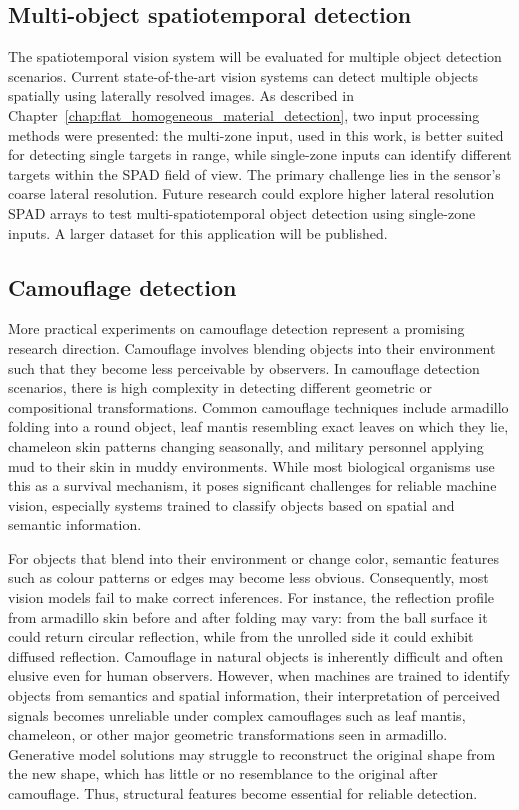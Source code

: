 \documentclass[12pt,a4paper,oneside]{report}
\begin{document}
\subsection{Multi-object spatiotemporal detection}
\label{subsec:multi_object_spatiotemporal_detection}

The spatiotemporal vision system will be evaluated for multiple object detection scenarios. Current state-of-the-art vision systems can detect multiple objects spatially using laterally resolved images. As described in Chapter~\ref{chap:flat_homogeneous_material_detection}, two input processing methods were presented: the multi-zone input, used in this work, is better suited for detecting single targets in range, while single-zone inputs can identify different targets within the SPAD field of view. The primary challenge lies in the sensor's coarse lateral resolution. Future research could explore higher lateral resolution SPAD arrays to test multi-spatiotemporal object detection using single-zone inputs. A larger dataset for this application will be published.

\subsection{Camouflage detection}
\label{subsec:camouflage_detection}

More practical experiments on camouflage detection represent a promising research direction. Camouflage involves blending objects into their environment such that they become less perceivable by observers. In camouflage detection scenarios, there is high complexity in detecting different geometric or compositional transformations. Common camouflage techniques include armadillo folding into a round object, leaf mantis resembling exact leaves on which they lie, chameleon skin patterns changing seasonally, and military personnel applying mud to their skin in muddy environments. While most biological organisms use this as a survival mechanism, it poses significant challenges for reliable machine vision, especially systems trained to classify objects based on spatial and semantic information.

For objects that blend into their environment or change color, semantic features such as colour patterns or edges may become less obvious. Consequently, most vision models fail to make correct inferences. For instance, the reflection profile from armadillo skin before and after folding may vary: from the ball surface it could return circular reflection, while from the unrolled side it could exhibit diffused reflection. Camouflage in natural objects is inherently difficult and often elusive even for human observers. However, when machines are trained to identify objects from semantics and spatial information, their interpretation of perceived signals becomes unreliable under complex camouflages such as leaf mantis, chameleon, or other major geometric transformations seen in armadillo. Generative model solutions may struggle to reconstruct the original shape from the new shape, which has little or no resemblance to the original after camouflage. Thus, structural features become essential for reliable detection.
\end{document}
